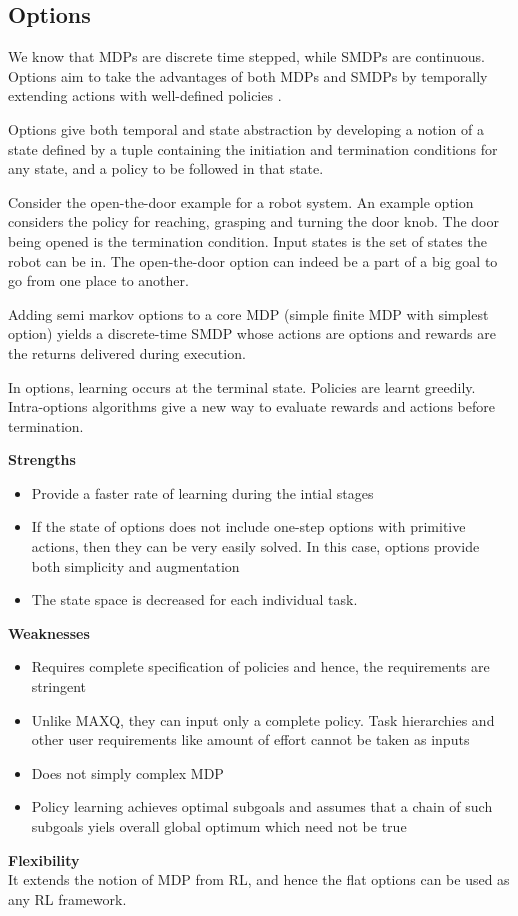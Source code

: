 \subsection{Options}

We know that MDPs are discrete time stepped, while SMDPs are continuous.
Options aim to take the advantages of both MDPs and SMDPs by temporally
extending actions with well-defined policies \cite{Sutton}.

Options give both temporal and state abstraction by developing a notion of a
state defined by a tuple containing the initiation and termination
conditions for any state, and a policy to be followed in that state.

Consider the open-the-door example for a robot system. An example option considers
the policy for reaching, grasping and turning the door knob. The door being
opened is the termination condition. Input states is the set of states the
robot can be in. The open-the-door option can indeed be a part of a big goal to
go from one place to another.

Adding semi markov options to a core MDP (simple finite MDP with simplest option) yields a
discrete-time SMDP whose actions are options and rewards are the returns
delivered during execution.

In options, learning occurs at the terminal state. Policies are learnt
greedily. Intra-options algorithms give a new way to evaluate rewards and
actions before termination.

\textbf{Strengths}
\begin{itemize}
    \item Provide a faster rate of learning during the intial stages
    \item If the state of options does not include one-step options with primitive actions, then they can be very easily solved. In this case, options provide both simplicity and augmentation
    \item The state space is decreased for each individual task.
\end{itemize}

\textbf{Weaknesses}
\begin{itemize}
    \item Requires complete specification of policies and hence, the requirements are stringent
    \item Unlike MAXQ, they can input only a complete policy. Task hierarchies and other user requirements like amount of effort cannot be taken as inputs
    \item Does not simply complex MDP
    \item Policy learning achieves optimal subgoals and assumes that a chain of such subgoals yiels overall global optimum which need not be true
\end{itemize}

\textbf{Flexibility} \\
It extends the notion of MDP from RL, and hence the flat options can be used as any RL framework.
